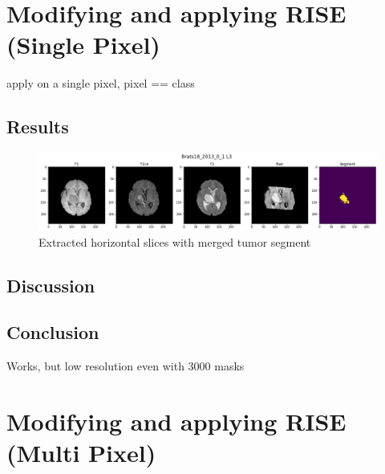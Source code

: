 \section{Modifying and applying RISE (Single Pixel)}

apply on a single pixel, pixel == class

\subsection{Results}

\begin{figure}[H]
\centering
\caption{Extracted horizontal slices with merged tumor segment}
\includegraphics[width=15cm]{chapters/04_segmentation/images/preprocessing.png}
\end{figure}



\subsection{Discussion}

\subsection{Conclusion}
Works, but low resolution even with 3000 masks

\section{Modifying and applying RISE (Multi Pixel)}


